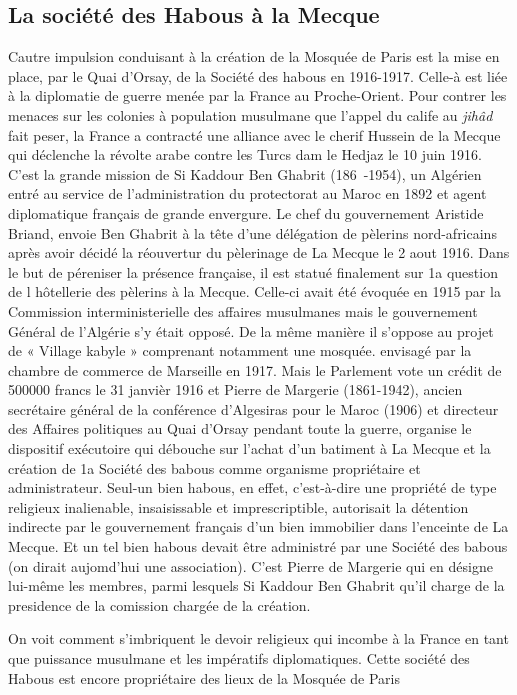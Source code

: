 \subsection{La société des Habous à la Mecque}
Cautre impulsion conduisant à la création de la Mosquée de
Paris est la mise en place, par le Quai d'Orsay, de la Société des
habous en 1916-1917. Celle-à est liée à la diplomatie de guerre
menée par la France au Proche-Orient. Pour contrer les menaces
sur les colonies à population musulmane que l'appel du calife au
\emph{jihâd} fait peser, la France a contracté une alliance avec le cherif
Hussein de la Mecque qui déclenche la révolte arabe contre les
Turcs dam le Hedjaz le 10 juin 1916. C'est la grande mission de
Si Kaddour Ben Ghabrit (186~-1954), un Algérien entré au service
de l'administration du protectorat au Maroc en 1892 et
agent diplomatique français de grande envergure.
Le chef du gouvernement Aristide Briand, envoie Ben Ghabrit à
la tête d'une délégation de pèlerins nord-africains après avoir
décidé la réouvertur du pèlerinage de La Mecque le 2 aout 1916.
Dans le but de péreniser la présence française, il est statué finalement
sur 1a question de l hôtellerie des pèlerins à la Mecque.
Celle-ci avait été évoquée en 1915 par la Commission interministerielle
des affaires musulmanes mais le gouvernement Général
de l'Algérie s'y était opposé. De la même manière il s'oppose
au projet de « Village kabyle » comprenant notamment une mosquée.
envisagé par la chambre de commerce de Marseille en
1917. Mais le Parlement vote un crédit de 500000 francs le
31 janvièr 1916 et Pierre de Margerie (1861-1942), ancien secrétaire
général de la conférence d'Algesiras pour le Maroc (1906)
et directeur des Affaires politiques au Quai d'Orsay pendant toute
la guerre, organise le dispositif exécutoire qui débouche sur
l'achat d'un batiment à La Mecque et la création de 1a Société des
babous comme organisme propriétaire et administrateur.
Seul-un bien habous, en effet, c'est-à-dire une propriété de type
religieux inalienable, insaisissable et imprescriptible, autorisait
la détention indirecte par le gouvernement français d'un bien
immobilier dans l'enceinte de La Mecque. Et un tel bien habous
devait être administré par une Société des babous (on dirait
aujomd'hui une association). C'est Pierre de Margerie qui en
désigne lui-même les membres, parmi lesquels Si Kaddour Ben
Ghabrit qu'il charge de la presidence de la comission chargée de la création. 

\begin{Synthesis}
On voit comment
s'imbriquent le devoir religieux qui incombe à la France en tant
que puissance musulmane et les impératifs diplomatiques.
Cette société des Habous est encore propriétaire des lieux de la Mosquée de Paris
\end{Synthesis}

